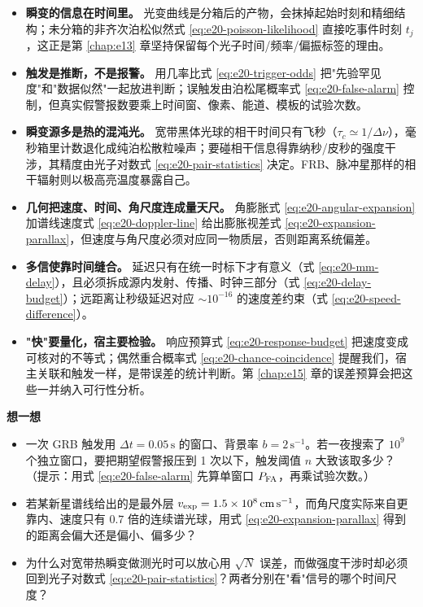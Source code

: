 \begin{itemize}
  \item \textbf{瞬变的信息在时间里。} 光变曲线是分箱后的产物，会抹掉起始时刻和精细结构；未分箱的非齐次泊松似然式 \eqref{eq:e20-poisson-likelihood} 直接吃事件时刻 \(t_j\)，这正是第 \ref{chap:e13} 章坚持保留每个光子时间/频率/偏振标签的理由。
  \item \textbf{触发是推断，不是报警。} 用几率比式 \eqref{eq:e20-trigger-odds} 把"先验罕见度"和"数据似然"一起放进判断；误触发由泊松尾概率式 \eqref{eq:e20-false-alarm} 控制，但真实假警报数要乘上时间窗、像素、能道、模板的试验次数。
  \item \textbf{瞬变源多是热的混沌光。} 宽带黑体光球的相干时间只有飞秒（\(\tau_c\simeq1/\Delta\nu\)），毫秒箱里计数退化成纯泊松散粒噪声；要碰相干信息得靠纳秒/皮秒的强度干涉，其精度由光子对数式 \eqref{eq:e20-pair-statistics} 决定。FRB、脉冲星那样的相干辐射则以极高亮温度暴露自己。
  \item \textbf{几何把速度、时间、角尺度连成量天尺。} 角膨胀式 \eqref{eq:e20-angular-expansion} 加谱线速度式 \eqref{eq:e20-doppler-line} 给出膨胀视差式 \eqref{eq:e20-expansion-parallax}，但速度与角尺度必须对应同一物质层，否则距离系统偏差。
  \item \textbf{多信使靠时间缝合。} 延迟只有在统一时标下才有意义（式 \eqref{eq:e20-mm-delay}），且必须拆成源内发射、传播、时钟三部分（式 \eqref{eq:e20-delay-budget}）；远距离让秒级延迟对应 \(\sim10^{-16}\) 的速度差约束（式 \eqref{eq:e20-speed-difference}）。
  \item \textbf{"快"要量化，宿主要检验。} 响应预算式 \eqref{eq:e20-response-budget} 把速度变成可核对的不等式；偶然重合概率式 \eqref{eq:e20-chance-coincidence} 提醒我们，宿主关联和触发一样，是带误差的统计判断。第 \ref{chap:e15} 章的误差预算会把这些一并纳入可行性分析。
\end{itemize}

\medskip
\noindent\textbf{想一想}
\begin{itemize}
  \item 一次 GRB 触发用 \(\Delta t=0.05\,\mathrm{s}\) 的窗口、背景率 \(b=2\,\mathrm{s^{-1}}\)。若一夜搜索了 \(10^{9}\) 个独立窗口，要把期望假警报压到 1 次以下，触发阈值 \(n\) 大致该取多少？（提示：用式 \eqref{eq:e20-false-alarm} 先算单窗口 \(P_{\rm FA}\)，再乘试验次数。）
  \item 若某新星谱线给出的是最外层 \(v_{\rm exp}=1.5\times10^8\,\mathrm{cm\,s^{-1}}\)，而角尺度实际来自更靠内、速度只有 \(0.7\) 倍的连续谱光球，用式 \eqref{eq:e20-expansion-parallax} 得到的距离会偏大还是偏小、偏多少？
  \item 为什么对宽带热瞬变做测光时可以放心用 \(\sqrt N\) 误差，而做强度干涉时却必须回到光子对数式 \eqref{eq:e20-pair-statistics}？两者分别在"看"信号的哪个时间尺度？
\end{itemize}
